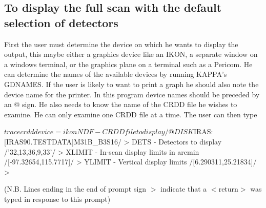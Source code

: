\documentclass[twoside,11pt]{starlink}
\begin{document}
\subsection{To display the full scan with the default selection of detectors}
First the user must determine the device on which he wants to display the
output, this maybe either a graphics device like an IKON, a separate window on
a windows terminal, or the graphics plane on a terminal such as a Pericom. He
can determine the names of the available devices by running KAPPA's GDNAMES. If
the user is likely to want to print a graph he should also note the device name
for the printer. In this program device names should be preceded by an @ sign.
He also needs to know the name of the CRDD file he wishes to examine. He can
only examine one CRDD file at a time. The user can then type
\begin{small}
\begin{terminalv}
$ tracecrdd device=ikon
NDF - CRDD file to display /@DISK$IRAS:[IRAS90.TESTDATA]M31B_B3S16/ >
DETS - Detectors to display /'32,13,36,9,33'/ >
XLIMIT - In-scan display limits in arcmin /[-97.32654,115.7717]/ >
YLIMIT - Vertical display limits /[6.290311,25.21834]/ >
\end{terminalv}
\end{small}

(N.B. Lines ending in the end of prompt sign $>$ indicate that  a $<$return$>$
was typed in response to this prompt)
\end{document}
